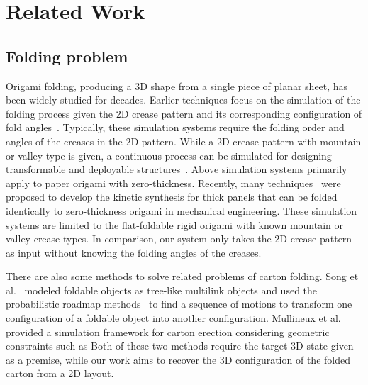 \section{Related Work}\label{sec:relatedwork}
\subsection{Folding problem}

Origami folding, producing a 3D shape from a single piece of planar sheet, has been widely studied for decades. Earlier techniques focus on the simulation of the folding process given the 2D crease pattern and its corresponding configuration of fold angles~\cite{Thiel1998,Kishi:1998:OFP:786112.786279,Nimnual2007Virtual}. Typically, these simulation systems require the folding order and angles of the creases in the 2D pattern. 
%
While a 2D crease pattern with mountain or valley type is given, a continuous process can be simulated for designing transformable and deployable structures~\cite{tachi2009simulation,tachigeometric}.
%
Above simulation systems primarily apply to paper origami with zero-thickness. Recently, many techniques~\cite{tachi2011rigid,chen2015origami,2016arXiv160105747K} were proposed to develop the kinetic synthesis for thick panels that can be folded identically to zero-thickness origami in mechanical engineering.
%
These simulation systems are limited to the flat-foldable rigid origami with known mountain or valley crease types. In comparison, our system only takes the 2D crease pattern as input without knowing the folding angles of the creases. 

 
There are also some methods to solve related problems of carton folding. 
Song et al.~\cite{Song:2000:MPA:892954} modeled foldable objects as tree-like multilink objects and used the probabilistic roadmap methods~\cite{Kavraki:1994:PRP:891758} to find a sequence of motions to transform one configuration of a foldable object into another configuration. 
Mullineux et al.~\cite{Mullineux:2010:CSC:1739328.1739673} provided a simulation framework for carton erection considering geometric constraints such as 
Both of these two methods require the target 3D state given as a premise, while our work aims to recover the 3D configuration of the folded carton from a 2D layout.

